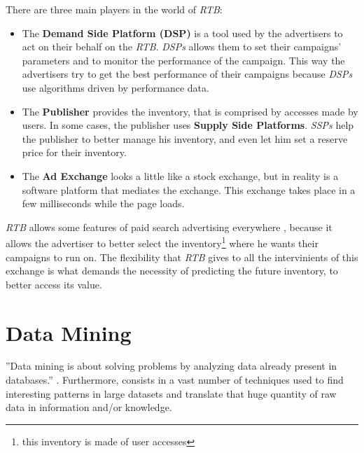 There are three main players in the world of \emph{RTB}: \begin{itemize} \item\label{itm:dsp} The \textbf{Demand Side Platform
      (DSP)} is a tool used by the advertisers to act on their behalf
      on the \emph{RTB}. \emph{DSPs} allows them to set their
      campaigns' parameters and to monitor the performance of the campaign. This
      way the advertisers try to get the best performance of their campaigns
      because \emph{DSPs} use algorithms driven by performance
      data\cite{Gern201230}. \item\label{itm:ssp} The \textbf{Publisher}
        provides the inventory, that is comprised by accesses made by users. In
        some cases, the publisher uses \textbf{Supply Side Platforms}.
        \emph{SSPs} help the publisher to better manage his inventory, and even
        let him set a reserve price for their
        inventory\cite{Yuan:2013:RBO:2501040.2501980}. \item\label{itm:adex} The
          \textbf{Ad Exchange} looks a little like a stock exchange, but in
          reality is a software platform that mediates the exchange. This
          exchange takes place in a few milliseconds while the page loads.
      \end{itemize}

\emph{RTB} allows some features of paid search advertising everywhere
\cite{Gern201230}, because it allows the advertiser to better select the
inventory\footnote{ this inventory is made of user accesses} where he wants
their campaigns to run on. The flexibility that \emph{RTB} gives to all the
intervinients of this exchange is what demands the necessity of predicting the
future inventory, to better access its value.



\section{Data Mining}\label{sec:datamining}
''Data mining is about solving problems by analyzing data already present in
databases.''\cite[p. 5]{Witten:2005:DMP:1205860}
. Furthermore, consists in a vast number of techniques used to find interesting
patterns in large datasets and translate that huge quantity of raw data in
information and/or knowledge. 

